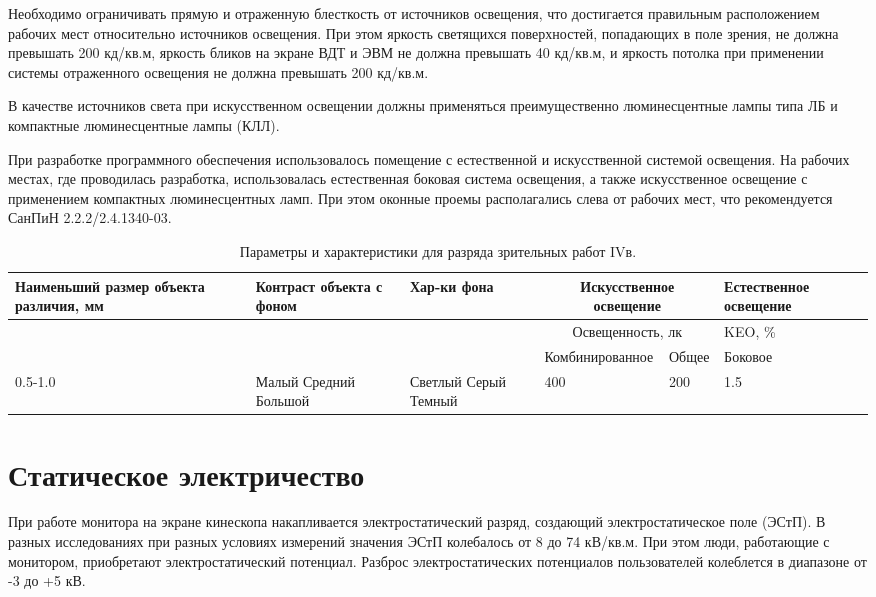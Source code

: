 Необходимо ограничивать прямую и отраженную блесткость от источников освещения, что достигается правильным расположением рабочих мест относительно источников освещения. При этом яркость светящихся поверхностей, попадающих в поле зрения, не должна превышать 200 кд/кв.м, яркость бликов на экране ВДТ и ЭВМ не должна превышать 40 кд/кв.м, и яркость потолка при применении системы отраженного освещения не должна превышать 200 кд/кв.м.

В качестве источников света при искусственном освещении должны применяться преимущественно люминесцентные лампы типа ЛБ и компактные люминесцентные лампы (КЛЛ).

При разработке программного обеспечения использовалось помещение с естественной и искусственной системой освещения. На рабочих местах, где проводилась разработка, использовалась естественная боковая система освещения, а также искусственное освещение с применением компактных люминесцентных ламп. При этом оконные проемы располагались слева от рабочих мест, что рекомендуется СанПиН 2.2.2/2.4.1340-03.

\begin{table}
\caption{Параметры и характеристики для разряда зрительных работ IVв.}
\label{table:phrz}
\begin{tabular} {| p{} | p{} | p{} | p{} | p{} |p{} |}
\hline
Наименьший размер объекта различия, мм & Контраст объекта с фоном & Хар-ки фона & \multicolumn{2}{|c|}{Искусственное освещение} & Естественное освещение\\
\hline
 & & & \multicolumn{2}{|c|}{Освещенность, лк} & KEO, \% \\
 \cline{4-6}
 & & & Комбинированное & Общее & Боковое \\
\hline
0.5-1.0 & Малый Средний Большой & Светлый Серый Темный & 400 & 200 & 1.5\\
\hline
\end{tabular}
\end{table}

\section{Статическое электричество}
При работе монитора на экране кинескопа накапливается электростатический разряд, создающий электростатическое поле (ЭСтП). В разных исследованиях при разных условиях измерений значения ЭСтП колебалось от 8 до 74 кВ/кв.м. При этом люди, работающие с монитором, приобретают электростатический потенциал. Разброс электростатических потенциалов пользователей колеблется в диапазоне от -3 до +5 кВ.

